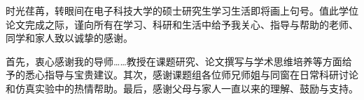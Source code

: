 \begin{thanks}
时光荏苒，转眼间在电子科技大学的硕士研究生学习生活即将画上句号。值此学位论文完成之际，谨向所有在学习、科研和生活中给予我关心、指导与帮助的老师、同学和家人致以诚挚的感谢。

首先，衷心感谢我的导师……教授在课题研究、论文撰写与学术思维培养等方面给予的悉心指导与宝贵建议。其次，感谢课题组各位师兄师姐与同窗在日常科研讨论和仿真实验中的热情帮助。最后，感谢父母与家人一直以来的理解、鼓励与支持。
\end{thanks}
